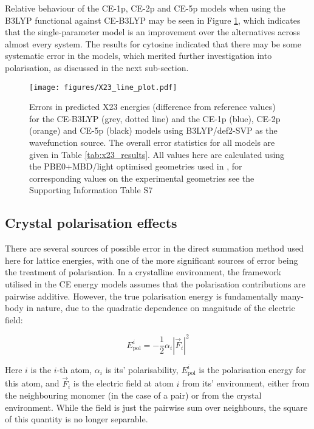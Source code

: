 \documentclass[preprint]{iucr}              %
\begin{document}
Relative behaviour of the CE-1p, CE-2p and CE-5p models when using the B3LYP
functional against CE-B3LYP may be seen in Figure \ref{fig:x23_errors}, which indicates that the
single-parameter model is an improvement over the alternatives across almost every system. The results for cytosine indicated that there
may be some systematic error in the models, which merited further investigation into polarisation, as discussed in the next sub-section. 

\begin{figure}
    \centering
    \texttt{[image: figures/X23\_line\_plot.pdf]}
    \caption{Errors in predicted X23 energies (difference from reference values) for the CE-B3LYP (grey, dotted line) and the 
    CE-1p (blue), CE-2p (orange) and CE-5p (black) models using B3LYP/def2-SVP as the wavefunction
    source. The overall error statistics for all models are given in Table \ref{tab:x23_results}. All
    values here are calculated using the PBE0+MBD/light optimised geometries used in \cite{Dolgonos2019}, for
    corresponding values on the experimental geometries see the Supporting Information Table S7 %
    }
    \label{fig:x23_errors}
\end{figure}

\subsection{Crystal polarisation effects}

There are several sources of possible error in the direct summation method used here for lattice energies, 
with one of the more significant sources of error being the treatment of polarisation. In a crystalline environment, 
the framework utilised in the CE energy models assumes that the polarisation contributions are pairwise additive. 
However, the true polarisation energy is fundamentally many-body in nature, due to the quadratic dependence on magnitude
of the electric field:

\begin{equation}
    \label{eqn:crystal_polarisation}
    E_\text{pol}^i = -\frac{1}{2} \alpha_i | \overrightarrow{F}_i |^2  
\end{equation}

Here $i$ is the $i$-th atom, $\alpha_i$ is its' polarisability, $E_\text{pol}^i$  is the polarisation energy for this atom,
and $\overrightarrow{F}_i$ is the electric field at atom $i$ from its' environment, either from the neighbouring monomer
(in the case of a pair) or from the crystal environment. While the field is just the pairwise sum over neighbours, the 
square of this quantity is no longer separable. 
\end{document}
